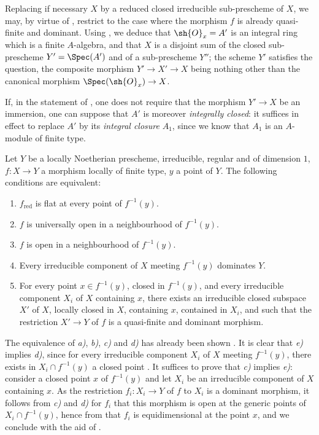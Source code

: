 Replacing if necessary $X$ by a reduced closed irreducible sub-prescheme of $X$, we may, by virtue of , restrict to the case where the morphism $f$ is already quasi-finite and dominant.
Using , we deduce that $\sh{O}_x=A'$ is an integral ring which is a finite $A$-algebra, and that $X$ is a disjoint sum of the closed sub-prescheme $Y'=\Spec(A')$ and of a sub-prescheme $Y''$; the scheme $Y'$ satisfies the question, the composite morphism $Y'\to X'\to X$ being nothing other than the canonical morphism $\Spec(\sh{O}_x)\to X$.

\begin{remark}[14.5.5]
\label{IV.14.5.5}
If, in the statement of , one does not require that the morphism $Y'\to X$ be an immersion, one can suppose that $A'$ is moreover \emph{integrally closed}: it suffices in effect to replace $A'$ by its \emph{integral closure} $A_1$, since we know  that $A_1$ is an $A$-module of finite type.
\end{remark}

\begin{proposition}[14.5.6]
\label{IV.14.5.6}
Let $Y$ be a locally Noetherian prescheme, irreducible, regular and of dimension $1$, $f:X\to Y$ a morphism locally of finite type, $y$ a point of $Y$.
The following conditions are equivalent:
\begin{enumerate}[label=\emph{\alph*)}]
  \item $f_{\mathrm{red}}$ is flat at every point of $f^{-1}(y)$.
  \item $f$ is universally open in a neighbourhood of $f^{-1}(y)$.
  \item $f$ is open in a neighbourhood of $f^{-1}(y)$.
  \item Every irreducible component of $X$ meeting $f^{-1}(y)$ dominates $Y$.
  \item For every point $x\in f^{-1}(y)$, closed in $f^{-1}(y)$, and every irreducible component $X_i$ of $X$ containing $x$, there exists an irreducible closed subspace $X'$ of $X$, locally closed in $X$, containing $x$, contained in $X_i$, and such that the restriction $X'\to Y$ of $f$ is a quasi-finite and dominant morphism.
\end{enumerate}
\end{proposition}

The equivalence of \emph{a)}, \emph{b)}, \emph{c)} and \emph{d)} has already been shown .
It is clear that \emph{e)} implies \emph{d)}, since for every irreducible component $X_i$ of $X$ meeting $f^{-1}(y)$, there exists in $X_i\cap f^{-1}(y)$ a closed point .
It suffices to prove that \emph{c)} implies \emph{e)}: consider a closed point $x$ of $f^{-1}(y)$ and let $X_i$ be an irreducible component of $X$ containing $x$.
As the restriction $f_i:X_i\to Y$ of $f$ to $X_i$ is a dominant morphism, it follows from \emph{c)} and \emph{d)} for $f_i$ that this morphism is open at the generic points of $X_i\cap f^{-1}(y)$, hence from  that $f_i$ is equidimensional at the point $x$, and we conclude with the aid of .

